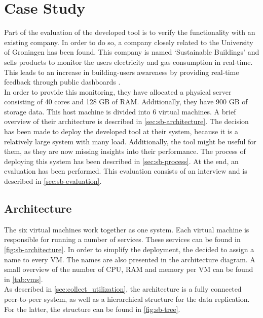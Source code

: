 \chapter{Case Study}\label{ch:evaluation}
Part of the evaluation of the developed tool is to verify the functionality with an existing company. In order to do so, a company closely related to the University of Groningen has been found. This company is named `Sustainable Buildings' and sells products to monitor the users electricity and gas consumption in real-time. This leads to an increase in building-users awareness by providing real-time feedback through public dashboards \cite{sb}.\\

\noindent
In order to provide this monitoring, they have allocated a physical server consisting of 40 cores and 128 GB of RAM. Additionally, they have 900 GB of storage data. This host machine is divided into 6 virtual machines. A brief overview of their architecture is described in \autoref{sec:sb-architecture}. The decision has been made to deploy the developed tool at their system, because it is a relatively large system with many load. Additionally, the tool might be useful for them, as they are now missing insights into their performance. The process of deploying this system has been described in \autoref{sec:sb-process}. At the end, an evaluation has been performed. This evaluation consists of an interview and is described in \autoref{sec:sb-evaluation}.

\section{Architecture} \label{sec:sb-architecture}
The six virtual machines work together as one system. Each virtual machine is responsible for running a number of services. These services can be found in \autoref{fig:sb-architecture}. In order to simplify the deployment, the decided to assign a name to every VM. The names are also presented in the architecture diagram. A small overview of the number of CPU, RAM and memory per VM can be found in \autoref{tab:vms}.\\

\noindent
As described in \autoref{sec:collect_utilization}, the architecture is a fully connected peer-to-peer system, as well as a hierarchical structure for the data replication. For the latter, the structure can be found in \autoref{fig:sb-tree}.


